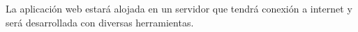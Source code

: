 
La aplicación web estará alojada en un servidor que tendrá conexión a internet y será desarrollada con diversas herramientas.
